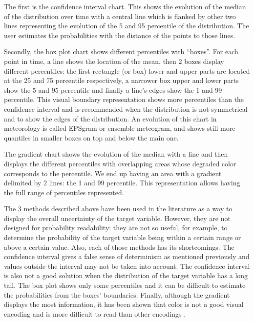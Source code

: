 \documentclass[a4paper,3p,sort&compress]{elsarticle}
\begin{document}
The first is the confidence interval chart. This shows the evolution of the
median of the distribution over time with a central line which is flanked by
other two lines representing the evolution of the 5 and 95
percentile of the distribution. The user estimates the probabilities with the
distance of the points to those lines.

Secondly, the box plot chart shows different percentiles with “boxes”. For each
point in time, a line shows the location of the mean, then 2 boxes display
different percentiles: the first rectangle (or box) lower and upper parts are
located at the 25 and 75 percentile respectively, a narrower box
upper and lower parts show the 5 and 95 percentile and finally a
line’s edges show the 1 and 99 percentile. This visual boundary
representation shows more percentiles than the confidence interval and is
recommended when the distribution is not symmetrical and to show the edges of
the distribution. An evolution of this chart in meteorology is called EPSgram or
ensemble meteogram, and shows still more quantiles in smaller boxes on top and
below the main one.

The gradient chart shows the evolution of the median with a line and then
displays the different percentiles with overlapping areas whose degraded color
corresponds to the percentile. We end up having an area with a gradient
delimited by 2 lines: the 1 and 99 percentile. This representation
allows having the full range of percentiles represented.

The 3 methods described above have been used in the literature as a way to
display the overall uncertainty of the target variable. However, they are not
designed for probability readability: they are not so useful, for example, to
determine the probability of the target variable being within a certain range or
above a certain value. Also, each of those methods has its shortcomings. The
confidence interval gives a false sense of determinism as mentioned previously
and values outside the interval may not be taken into account. The confidence
interval is also not a good solution when the distribution of the target
variable has a long tail. The box plot shows only some percentiles and it can be
difficult to estimate the probabilities from the boxes' boundaries. Finally,
although the gradient displays the most information, it has been shown that
color is not a good visual encoding and is more difficult to read than other
encodings \cite{cleveland_graphical_1984}.
\end{document}
